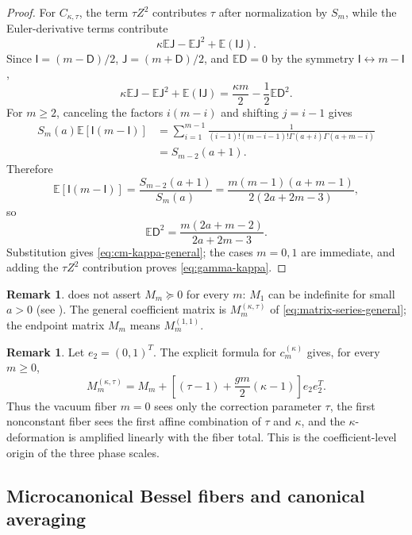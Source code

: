 \documentclass[11pt,a4paper]{amsart}
\numberwithin{equation}{section}
\theoremstyle{plain}
\theoremstyle{definition}
\newtheorem{remark}[theorem]{Remark}
\newcommand{\E}{\mathbb E}
\newcommand{\Dfin}{\mathsf D}
\begin{document}
\begin{proof}
For \(C_{\kappa,\tau}\), the term \(\tau Z^2\) contributes \(\tau\) after normalization by \(S_m\), while the Euler-derivative terms contribute
\[
 \kappa\E \mathsf J-\E \mathsf J^2+\E(\mathsf I\mathsf J).
\]
Since \(\mathsf I=(m-\Dfin)/2\), \(\mathsf J=(m+\Dfin)/2\), and \(\E\Dfin=0\) by the symmetry \(\mathsf I\leftrightarrow m-\mathsf I\),
\begin{equation}\label{eq:c-cond-derivation}
 \kappa\E \mathsf J-\E \mathsf J^2+\E(\mathsf I\mathsf J)
 =\frac{\kappa m}{2}-\frac12\E\Dfin^2.
\end{equation}
For \(m\ge2\), canceling the factors \(i(m-i)\) and shifting
\(j=i-1\) gives
\begin{align*}
 S_m(a)\E[\mathsf I(m-\mathsf I)]
 &=\sum_{i=1}^{m-1}
 \frac1{(i-1)!(m-i-1)!\Gamma(a+i)\Gamma(a+m-i)}\\
 &=S_{m-2}(a+1).
\end{align*}
Therefore
\[
 \E[\mathsf I(m-\mathsf I)]
 =\frac{S_{m-2}(a+1)}{S_m(a)}
 =\frac{m(m-1)(a+m-1)}{2(2a+2m-3)},
\]
so
\[
 \E\Dfin^2=\frac{m(2a+m-2)}{2a+2m-3}.
\]
Substitution gives \eqref{eq:cm-kappa-general}; the cases \(m=0,1\) are immediate, and adding the \(\tau Z^2\) contribution proves \eqref{eq:gamma-kappa}.
\end{proof}

\begin{remark}\label{rem:coefficient-caveat}
 does not assert \(M_m\succeq0\) for every \(m\):
\(M_1\) can be indefinite for small \(a>0\) (see ).  The general
coefficient matrix is \(M_m^{(\kappa,\tau)}\) of
\eqref{eq:matrix-series-general}; the endpoint matrix \(M_m\) means
\(M_m^{(1,1)}\).
\end{remark}

\begin{remark}\label{rem:fiber-deformation}
Let \(e_2=(0,1)^T\).  The explicit formula for \(c_m^{(\kappa)}\) gives, for
every \(m\ge0\),
\begin{equation}\label{eq:fiber-affine}
 M_m^{(\kappa,\tau)}
 =M_m+
 \left[(\tau-1)+\frac{gm}{2}(\kappa-1)\right]e_2e_2^T.
\end{equation}
Thus the vacuum fiber \(m=0\) sees only the correction parameter \(\tau\), the
first nonconstant fiber sees the first affine combination of \(\tau\) and
\(\kappa\), and the \(\kappa\)-deformation is amplified linearly with the
fiber total.  This is the coefficient-level origin of the three phase scales.
\end{remark}

\subsection{Microcanonical Bessel fibers and canonical averaging}\label{subsec:microcanonical}
\end{document}

